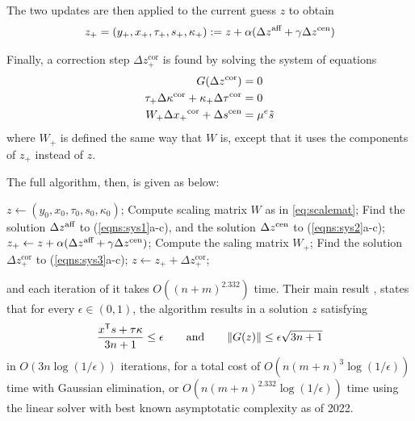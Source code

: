\documentclass[twoside]{article}
\begin{document}
\begin{lproof}
    The two updates are then applied to the current guess $z$ to obtain
    \[
        z_+ = (y_+, x_+, \tau_+, s_+, \kappa_+) := z + \alpha (\Delta {z}^{\text{aff}} + \gamma \Delta {z}^{\text{cen}})
    \]
    
    Finally, a correction step $\Delta z_+^{\text{cor}}$
        is found by solving the system of equations
    \begin{subequations}\label{eqns:sys3}
    \begin{align}
        G(\Delta z^{\text{cor}}) &= 0 \\
        \tau_+ \Delta \kappa^{\text{cor}}  + \kappa_+ \Delta \tau^{\text{cor}} &= 0 \\
        W_+ \Delta {x_+}^{\text{cor}} + \Delta {s}^{\text{cen}} &= \mu^e \tilde s
    \end{align}
    \end{subequations}
    where
    $W_+$ is defined the same way that $W$ is, except that it uses the components of $z_+$ instead of $z$. 
    
    The full algorithm, then, is given as below:

    \begin{algorithmic}[1]
        \State $z \gets (y_0, x_0, \tau_0, s_0, \kappa_0)$;
        \While{}
            \State Compute scaling matrix $W$ as in \eqref{eq:scalemat};
            \State Find the solution $\Delta {z}^{\text{aff}}$ to (\ref{eqns:sys1}a-c),
                and the solution $\Delta {z}^{\text{cen}}$ to (\ref{eqns:sys2}a-c);
            \State $z_+ \gets z + \alpha (\Delta {z}^{\text{aff}} + \gamma \Delta {z}^{\text{cen}})$;
            \State Compute the saling matrix $W_+$;
            \State Find the solution $\Delta z^{\text{cor}}_+$ to (\ref{eqns:sys3}a-c);
            \State $z \gets z_+ + \Delta z_+^{\text{cor}}$;
        \EndWhile
    \end{algorithmic}
    
    and each iteration of it takes $O((n+m)^{2.332})$ time. 
    Their main result \parencite[Theorem 3]{badenbroek2021algorithm}, states that for every $\epsilon \in (0,1)$,
    the algorithm results in a solution $z$ satisfying
    \[
        \frac{x^{\sf T} s + \tau \kappa}{3n + 1}
        \le \epsilon
        \qquad \text{and}\qquad
        \Vert G(z) \Vert \le \epsilon 
            \sqrt{3n + 1}
    \]
    in $O(3n \log (1/\epsilon))$ iterations, 
    for a total cost of 
    $O(n (m+n)^3 \log (1/\epsilon) )$ time with Gaussian elimination, or
    $O(n (m+n)^{2.332} \log (1/\epsilon) )$ time using the linear solver with best
         known asymptotatic complexity as of 2022.
         

\end{lproof}
\end{document}
